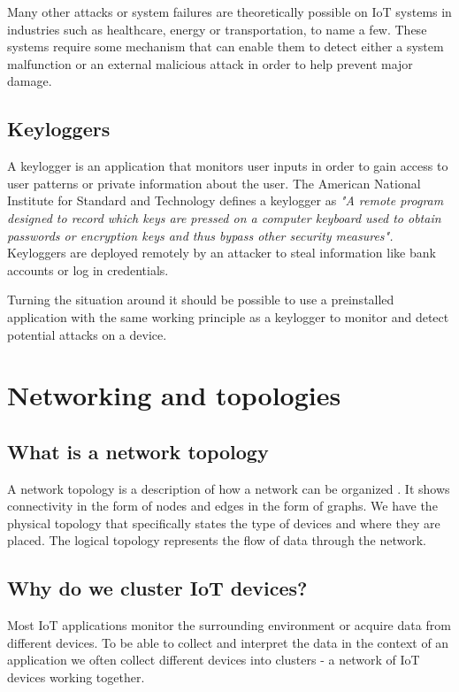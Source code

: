 Many other attacks or system failures are theoretically possible on IoT systems in industries such as healthcare, energy or transportation, to name a few. These systems require some mechanism that can enable them to detect either a system malfunction or an external malicious attack in order to help prevent major damage.


\subsection{Keyloggers}
A keylogger is an application that monitors user inputs in order to gain access to user patterns or private information about the user. 
The American National Institute for Standard and Technology defines a keylogger as \textit{"A remote program designed to record which keys are pressed on a computer keyboard used to obtain passwords or encryption keys and thus bypass other security measures".} Keyloggers are deployed remotely by an attacker to steal information like bank accounts or log in credentials. 

Turning the situation around it should be possible to use a preinstalled application with the same working principle as a keylogger to monitor and detect potential attacks on a device. 

\section{Networking and topologies}

\subsection{What is a network topology}
A network topology is a description of how a network can be organized \cite{network_topologies}. It shows connectivity in the form of nodes and edges in the form of graphs. We have the physical topology that specifically states the type of devices and where they are placed. The logical topology represents the flow of data through the network.

\subsection{Why do we cluster IoT devices?}
Most IoT applications monitor the surrounding environment or acquire data from different devices. To be able to collect and interpret the data in the context of an application we often collect different devices into clusters - a network of IoT devices working together. \\

